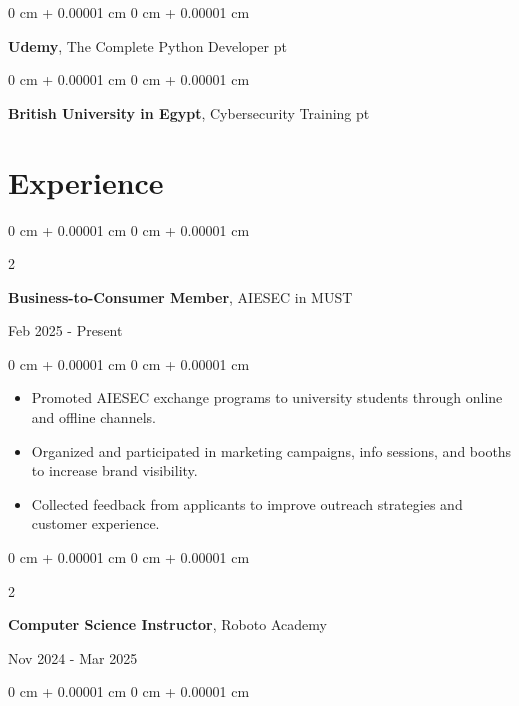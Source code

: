\documentclass[10pt, letterpaper]{article}
\newenvironment{highlights}{
    \begin{itemize}[
        topsep=0.10 cm,
        parsep=0.10 cm,
        partopsep=0pt,
        itemsep=0pt,
        leftmargin=0 cm + 10pt
    ]
}{
    \end{itemize}
} %
\newenvironment{onecolentry}{
    \begin{adjustwidth}{
        0 cm + 0.00001 cm
    }{
        0 cm + 0.00001 cm
    }
}{
    \end{adjustwidth}
} %
\newenvironment{twocolentry}[2][]{
    \onecolentry
    \def\secondColumn{#2}
    \setcolumnwidth{\fill, 4.5 cm}
    \begin{paracol}{2}
}{
    \switchcolumn \raggedleft \secondColumn
    \end{paracol}
    \endonecolentry
} %
\begin{document}
                                    \begin{onecolentry}
                                    \textbf{Udemy}, The Complete Python Developer
                                         pt%
                                    \begin{onecolentry}
                                    \textbf{British University in Egypt}, Cybersecurity Training
                                         pt%
                                \end{onecolentry}
                                \vspace{0.10 cm}
                                
        \section{Experience}
        
            \begin{twocolentry}{
                Feb 2025 - Present
            }
                \textbf{Business-to-Consumer Member}, AIESEC in MUST
            \end{twocolentry}

            \vspace{0.10 cm}
            \begin{onecolentry}
                \begin{highlights}
                    
                    \item Promoted AIESEC exchange programs to university students through online and offline channels.
                    \item Organized and participated in marketing campaigns, info sessions, and booths to increase brand visibility.
                    \item Collected feedback from applicants to improve outreach strategies and customer experience.
                \end{highlights}
            \end{onecolentry}
            
            \begin{twocolentry}{
                Nov 2024 - Mar 2025
            }
                \textbf{Computer Science Instructor}, Roboto Academy
            \end{twocolentry}

            \vspace{0.10 cm}
            \begin{onecolentry}
                \begin{highlights}
                    

\end{highlights}
\end{onecolentry}
\end{onecolentry}
\end{document}
